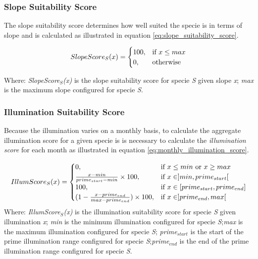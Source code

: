 \subsubsection{Slope Suitability Score}

The slope suitability score determines how well suited the specie is in terms of slope and is calculated as illustrated in equation \ref{eq:slope_suitability_score}.

\begin{equation}
\centering
SlopeScore_{S}(x) = 
\begin{cases}
    100, & \text{if } x \leq max \\
    0,              & \text{otherwise}
\end{cases}
\label{eq:slope_suitability_score}
\end{equation}

Where: \textit{SlopeScore$_{S}$(x)} is the slope suitability score for specie \textit{S} given slope \textit{x}; \textit{max} is the maximum slope configured for specie \textit{S}.

\subsubsection{Illumination Suitability Score}

Because the illumination varies on a monthly basis, to calculate the aggregate illumination score for a given specie is is necessary to calculate the \textit{illumination score} for each month as illustrated in equation \ref{eq:monthly_illumination_score}.

\begin{equation}
\centering
IllumScore_{S}(x) = 
\begin{cases}
    0, & \text{if } x \leq min \text{ or } x \geq max \\
    \frac{x - min}{prime_{start} - min} \times 100, & \text{if } x \in ]min,prime_{start}[ \\
    100, & \text{if } x \in [prime_{start},prime_{end}] \\
    (1 - \frac{x - prime_{end}}{max-prime_{end}}) \times 100, & \text{if } x \in ]prime_{end},max[ \\
\end{cases}
\label{eq:monthly_illumination_score}
\end{equation}
Where: \textit{IllumScore$_{S}$(x)} is the illumination suitability score for specie \textit{S} given illumination \textit{x}; \textit{min} is the minimum illumination configured for specie \textit{S};\textit{max} is the maximum illumination configured for specie \textit{S}; \textit{prime$_{start}$} is the start of the prime illumination range configured for specie \textit{S};\textit{prime$_{end}$} is the end of the prime illumination range configured for specie \textit{S}.

